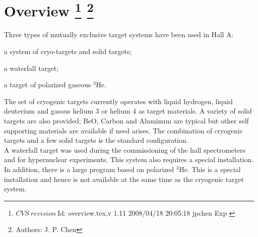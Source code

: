 \chapter[Overview]{ Overview
\label{sec:targets-overv}
\footnote{
  $CVS~revision~ $Id: overview.tex,v 1.11 2008/04/18 20:05:18 jpchen Exp $ $ }
\footnote{Authors: J. P. Chen }
}

Three types of mutually exclusive target systems have been used in Hall A:

\begin{list}{.~}{\setlength{\itemsep}{-0.15cm}}
  \item a system of cryo-targets and solid targets;
  \item a waterfall target;
  \item a target of polarized gaseous $^3$He.
\end{list}

The set of
cryogenic targets currently operates with liquid hydrogen, liquid
deuterium and gasous helium 3 or helium 4
as target materials.
A variety of solid targets are also provided; BeO, Carbon and
Aluminum are typical but other self supporting materials are available if need arises.
The combination of cryogenic targets and a few solid targets is
the standard configuration. \\

A waterfall target was used during the commissioning of
the hall spectrometers and for hypernuclear experiments. This system also 
requires a special installation. \\

In addition,
there is a large program based on polarized $^3$He. This
is a special installation and hence is not available at the same
time as the cryogenic target system.\\

